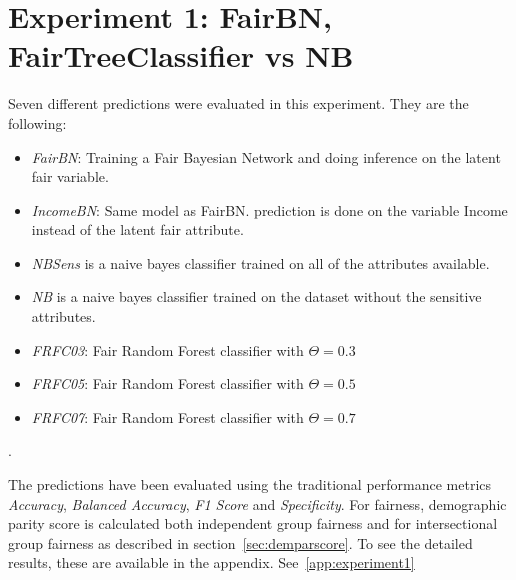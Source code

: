 \section{Experiment 1: FairBN, FairTreeClassifier vs NB}
\label{sec:AdultFairnessAssessment}

Seven different predictions were evaluated in this experiment. They are the following:

\begin{itemize}
    \item \emph{FairBN}: Training a Fair Bayesian Network and doing inference on the latent fair variable.
    \item  \emph{IncomeBN}: Same model as FairBN. prediction is done on the variable Income instead of the latent fair attribute.
    \item \emph{NBSens} is a naive bayes classifier trained on all of the attributes available. 
    \item \emph{NB} is a naive bayes classifier trained on the dataset without the sensitive attributes. 
    \item \emph{FRFC03}: Fair Random Forest classifier with $\Theta = 0.3$
    \item \emph{FRFC05}: Fair Random Forest classifier with $\Theta = 0.5$
    \item \emph{FRFC07}: Fair Random Forest classifier with $\Theta = 0.7$
\end{itemize} . 

The predictions have been evaluated using the traditional performance metrics \emph{Accuracy}, \emph{Balanced Accuracy}, \emph{F1 Score} and \emph{Specificity}. For fairness, demographic parity score is calculated both independent group fairness and for intersectional group fairness as described in section~\ref{sec:demparscore}. To see the detailed results, these are available in the appendix. See~\ref{app:experiment1}


